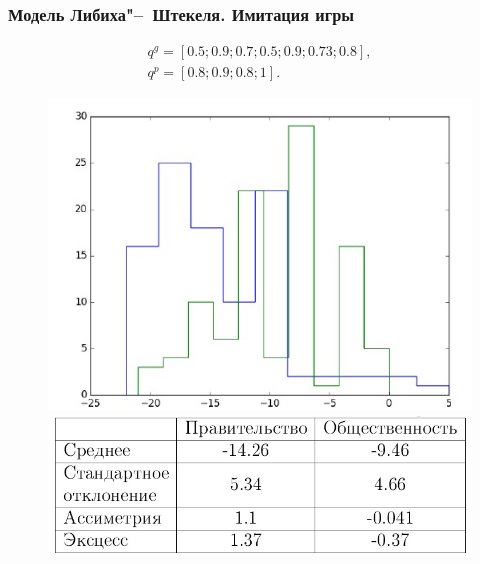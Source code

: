 \documentclass {beamer}
\begin{document}
\begin{frame}
\frametitle{Модель Либиха"--~Штекеля. Имитация игры}
	
	 \begin{gather*}
	 q^g = \left[ 0.5; 0.9; 0.7; 0.5; 0.9; 0.73; 0.8 \right], \\
	 q^p = \left[ 0.8; 0.9; 0.8; 1 \right].
	 \end{gather*}
	 \begin{figure}
	 	\begin{minipage}[b]{0.45\textwidth}
	 		
	 	\includegraphics[width=\textwidth]{government1}
	 \end{minipage}
	 \begin{minipage}[b]{0.45\textwidth}
	 	\includegraphics[width=\textwidth]{third}
	 \end{minipage}
	 
	 \end{figure}


\end{frame}
\end{document}
